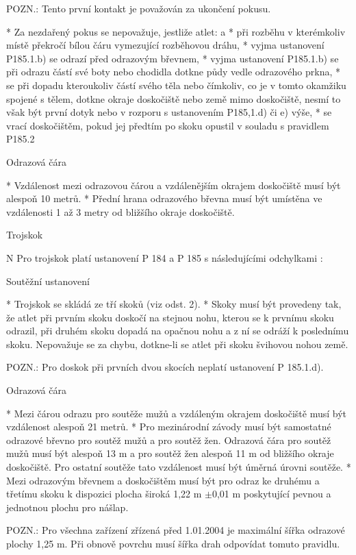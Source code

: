 POZN.: Tento první kontakt je považován za ukončení pokusu.

* Za nezdařený pokus se nepovažuje, jestliže atlet:
  \begitems \style a
  * při rozběhu v kterémkoliv místě překročí bílou čáru vymezující rozběhovou dráhu,
  * vyjma ustanovení P185.1.b)  se odrazí před odrazovým břevnem,
  * vyjma ustanovení P185.1.b)  se při odrazu částí své boty nebo chodidla dotkne půdy vedle odrazového prkna,
  * se při dopadu kteroukoliv částí svého těla nebo čímkoliv, co je v tomto okamžiku spojené s tělem, dotkne okraje doskočiště nebo země mimo doskočiště, nesmí to však být první dotyk nebo v rozporu s ustanovením P185,1.d) či e) výše,
  * se vrací doskočištěm, pokud jej předtím po skoku opustil v souladu s pravidlem P185.2
  \enditems

Odrazová čára

* Vzdálenost mezi odrazovou čárou a vzdálenějším okrajem doskočiště musí být alespoň 10 metrů.
* Přední hrana odrazového břevna musí být umístěna ve vzdálenosti 1 až 3 metry od bližšího okraje doskočiště.
\enditems

\secc Trojskok

\begitems \style N
Pro trojskok platí ustanovení P 184 a P 185 s následujícími odchylkami :

Soutěžní ustanovení

* Trojskok se skládá ze tří skoků (viz odst. 2).
* Skoky musí být provedeny tak, že atlet při prvním skoku doskočí na stejnou nohu, kterou se k prvnímu skoku odrazil, při druhém skoku dopadá na opačnou nohu a z ní se odráží k poslednímu skoku. Nepovažuje se za chybu, dotkne-li se atlet při skoku švihovou nohou země.

POZN.: Pro doskok při prvních dvou skocích neplatí ustanovení P 185.1.d).

Odrazová čára

* Mezi čárou odrazu pro soutěže mužů a vzdáleným okrajem doskočiště musí být vzdálenost alespoň 21 metrů.
* Pro mezinárodní závody musí být samostatné odrazové břevno pro soutěž mužů a pro soutěž žen.  Odrazová čára pro soutěž mužů musí být alespoň 13 m a pro soutěž žen alespoň 11 m od bližšího okraje doskočiště. Pro ostatní soutěže tato vzdálenost musí být úměrná úrovni soutěže.
* Mezi odrazovým břevnem a doskočištěm musí být pro odraz ke druhému a třetímu skoku k dispozici plocha široká 1,22 m $\pm$0,01 m poskytující pevnou a jednotnou plochu pro nášlap.

POZN.: Pro všechna zařízení zřízená před 1.01.2004 je maximální šířka odrazové plochy 1,25 m. Při obnově povrchu musí šířka drah odpovídat tomuto pravidlu.

